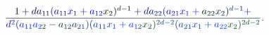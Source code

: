 \documentclass[12pt]{article}
\begin{document}
\makeatletter
\renewcommand*{\@textcolor}[3]{%
  \protect\leavevmode
  \begingroup
    \color#1{#2}#3%
  \endgroup
}
\makeatother
\begin{displaymath}
\mathcolor[RGB]{0,0,15}{\frac { \mathcolor[RGB]{0,0,30}{1} \mathcolor[RGB]{0,0,45}{+} \mathcolor[RGB]{0,0,60}{d} \mathcolor[RGB]{0,0,75}{a} _ { \mathcolor[RGB]{0,0,90}{1} \mathcolor[RGB]{0,0,105}{1} } \mathcolor[RGB]{0,0,120}{(} \mathcolor[RGB]{0,0,135}{a} _ { \mathcolor[RGB]{0,0,150}{1} \mathcolor[RGB]{0,0,165}{1} } \mathcolor[RGB]{0,0,180}{x} _ { \mathcolor[RGB]{0,0,195}{1} } \mathcolor[RGB]{0,0,210}{+} \mathcolor[RGB]{0,0,225}{a} _ { \mathcolor[RGB]{0,0,240}{1} \mathcolor[RGB]{0,0,255}{2} } \mathcolor[RGB]{0,15,0}{x} _ { \mathcolor[RGB]{0,15,15}{2} } \mathcolor[RGB]{0,15,30}{)} ^ { \mathcolor[RGB]{0,15,45}{d} \mathcolor[RGB]{0,15,60}{-} \mathcolor[RGB]{0,15,75}{1} } \mathcolor[RGB]{0,15,90}{+} \mathcolor[RGB]{0,15,105}{d} \mathcolor[RGB]{0,15,120}{a} _ { \mathcolor[RGB]{0,15,135}{2} \mathcolor[RGB]{0,15,150}{2} } \mathcolor[RGB]{0,15,165}{(} \mathcolor[RGB]{0,15,180}{a} _ { \mathcolor[RGB]{0,15,195}{2} \mathcolor[RGB]{0,15,210}{1} } \mathcolor[RGB]{0,15,225}{x} _ { \mathcolor[RGB]{0,15,240}{1} } \mathcolor[RGB]{0,15,255}{+} \mathcolor[RGB]{0,30,0}{a} _ { \mathcolor[RGB]{0,30,15}{2} \mathcolor[RGB]{0,30,30}{2} } \mathcolor[RGB]{0,30,45}{x} _ { \mathcolor[RGB]{0,30,60}{2} } \mathcolor[RGB]{0,30,75}{)} ^ { \mathcolor[RGB]{0,30,90}{d} \mathcolor[RGB]{0,30,105}{-} \mathcolor[RGB]{0,30,120}{1} } \mathcolor[RGB]{0,30,135}{+} } { \mathcolor[RGB]{0,30,150}{d} ^ { \mathcolor[RGB]{0,30,165}{2} } \mathcolor[RGB]{0,30,180}{(} \mathcolor[RGB]{0,30,195}{a} _ { \mathcolor[RGB]{0,30,210}{1} \mathcolor[RGB]{0,30,225}{1} } \mathcolor[RGB]{0,30,240}{a} _ { \mathcolor[RGB]{0,30,255}{2} \mathcolor[RGB]{0,45,0}{2} } \mathcolor[RGB]{0,45,15}{-} \mathcolor[RGB]{0,45,30}{a} _ { \mathcolor[RGB]{0,45,45}{1} \mathcolor[RGB]{0,45,60}{2} } \mathcolor[RGB]{0,45,75}{a} _ { \mathcolor[RGB]{0,45,90}{2} \mathcolor[RGB]{0,45,105}{1} } \mathcolor[RGB]{0,45,120}{)} \mathcolor[RGB]{0,45,135}{(} \mathcolor[RGB]{0,45,150}{a} _ { \mathcolor[RGB]{0,45,165}{1} \mathcolor[RGB]{0,45,180}{1} } \mathcolor[RGB]{0,45,195}{x} _ { \mathcolor[RGB]{0,45,210}{1} } \mathcolor[RGB]{0,45,225}{+} \mathcolor[RGB]{0,45,240}{a} _ { \mathcolor[RGB]{0,45,255}{1} \mathcolor[RGB]{0,60,0}{2} } \mathcolor[RGB]{0,60,15}{x} _ { \mathcolor[RGB]{0,60,30}{2} } \mathcolor[RGB]{0,60,45}{)} ^ { \mathcolor[RGB]{0,60,60}{2} \mathcolor[RGB]{0,60,75}{d} \mathcolor[RGB]{0,60,90}{-} \mathcolor[RGB]{0,60,105}{2} } \mathcolor[RGB]{0,60,120}{(} \mathcolor[RGB]{0,60,135}{a} _ { \mathcolor[RGB]{0,60,150}{2} \mathcolor[RGB]{0,60,165}{1} } \mathcolor[RGB]{0,60,180}{x} _ { \mathcolor[RGB]{0,60,195}{1} } \mathcolor[RGB]{0,60,210}{+} \mathcolor[RGB]{0,60,225}{a} _ { \mathcolor[RGB]{0,60,240}{2} \mathcolor[RGB]{0,60,255}{2} } \mathcolor[RGB]{0,75,0}{x} _ { \mathcolor[RGB]{0,75,15}{2} } \mathcolor[RGB]{0,75,30}{)} ^ { \mathcolor[RGB]{0,75,45}{2} \mathcolor[RGB]{0,75,60}{d} \mathcolor[RGB]{0,75,75}{-} \mathcolor[RGB]{0,75,90}{2} } } } \mathcolor[RGB]{0,75,105}{.}
\end{displaymath}
\end{document}

